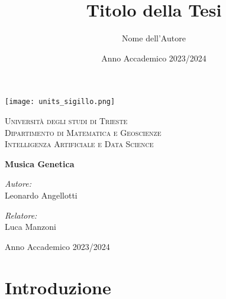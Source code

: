 \documentclass[a4paper,12pt]{report}
\title{Titolo della Tesi}
\author{Nome dell'Autore}
\date{Anno Accademico 2023/2024}
\begin{document}
\begin{titlepage}
    \begin{center}
        \texttt{[image: units\_sigillo.png]} 
        \vspace{1cm}
        
        \textsc{\LARGE Università degli studi di Trieste}\\[1.5cm]
        
        \textsc{\Large Dipartimento di Matematica e Geoscienze}\\[0.5cm]
        
        \textsc{\large Intelligenza Artificiale e Data Science}\\[0.5cm]
        
        \vspace{2cm}
        
        { \huge \bfseries Musica Genetica \\[0.4cm] }
        
        \vspace{2cm}
        
        \begin{minipage}{0.4\textwidth}
            \begin{flushleft} \large
                \emph{Autore:}\\
                Leonardo Angellotti
            \end{flushleft}
        \end{minipage}
        \begin{minipage}{0.4\textwidth}
            \begin{flushright} \large
                \emph{Relatore:} \\
                Luca Manzoni
            \end{flushright}
        \end{minipage}
        
        \vfill
        
        {\large Anno Accademico 2023/2024}
        
    \end{center}
\end{titlepage}

\tableofcontents

\chapter{Introduzione}
\end{document}
